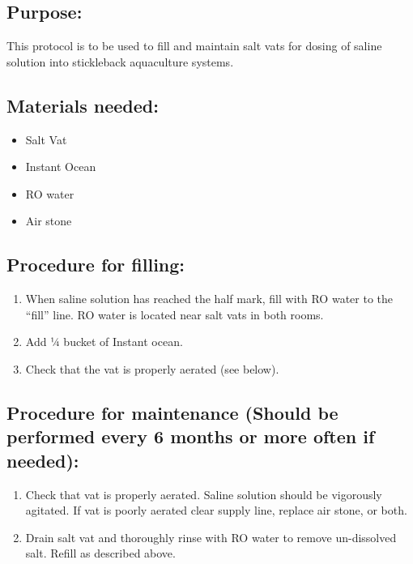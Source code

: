 \documentclass[
]{book}
\providecommand{\tightlist}{%
  \setlength{\itemsep}{0pt}\setlength{\parskip}{0pt}}
\begin{document}
\hypertarget{purpose-2}{%
\subsection{Purpose:}\label{purpose-2}}

This protocol is to be used to fill and maintain salt vats for dosing of saline solution into stickleback aquaculture systems.

\hypertarget{materials-needed-5}{%
\subsection{Materials needed:}\label{materials-needed-5}}

\begin{itemize}
\tightlist
\item
  Salt Vat
\item
  Instant Ocean
\item
  RO water
\item
  Air stone
\end{itemize}

\hypertarget{procedure-for-filling}{%
\subsection{Procedure for filling:}\label{procedure-for-filling}}

\begin{enumerate}
\def\labelenumi{\arabic{enumi}.}
\tightlist
\item
  When saline solution has reached the half mark, fill with RO water to the ``fill'' line. RO water is located near salt vats in both rooms.
\item
  Add ¼ bucket of Instant ocean.
\item
  Check that the vat is properly aerated (see below).
\end{enumerate}

\hypertarget{procedure-for-maintenance-should-be-performed-every-6-months-or-more-often-if-needed}{%
\subsection{Procedure for maintenance (Should be performed every 6 months or more often if needed):}\label{procedure-for-maintenance-should-be-performed-every-6-months-or-more-often-if-needed}}

\begin{enumerate}
\def\labelenumi{\arabic{enumi}.}
\tightlist
\item
  Check that vat is properly aerated. Saline solution should be vigorously agitated. If vat is poorly aerated clear supply line, replace air stone, or both.
\item
  Drain salt vat and thoroughly rinse with RO water to remove un-dissolved salt. Refill as described above.
\end{enumerate}
\end{document}
